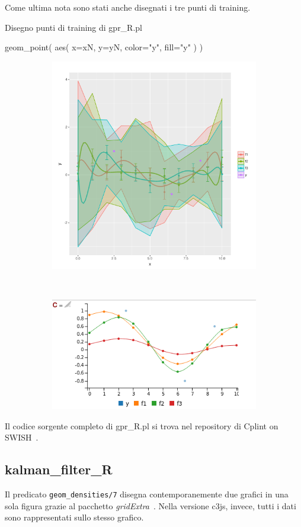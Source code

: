 \documentclass[10pt,titlepage,twoside,a4paper]{report}
\newenvironment{code}{\singlespacing\captionsetup{type=listing}}{}
\begin{document}
Come ultima nota sono stati anche disegnati i tre punti di training.
\begin{code}
\caption{Disegno punti di training di gpr\_R.pl}
\begin{rcode*}{}
geom_point(
    aes(
        x=xN,
        y=yN,
        color="y",
        fill="y"
    )
)
\end{rcode*}
\end{code}

\begin{figure}[H]
\caption{Risultato di \texttt{draw\_fun\_pred(sq\_exp\_p).} di gpr.pl}
\centering
    \begin{subfigure}[b]{0.5\textwidth}
        \includegraphics[width=.5\linewidth]{gpr_R_plot.png}
    \end{subfigure}~\begin{subfigure}[b]{0.5\textwidth}
        \includegraphics[width=.5\linewidth]{gpr_plot.png}
    \end{subfigure}
\end{figure}

Il codice sorgente completo di gpr\_R.pl si trova nel repository di 
Cplint on SWISH~\cite{gprRpl}.

\subsection{kalman\_filter\_R}
Il predicato \texttt{geom\_densities/7} disegna contemporanemente
due grafici in una sola figura grazie al pacchetto
\emph{gridExtra}~\cite{gridExtra}. Nella versione c3js, invece, tutti i dati 
sono rappresentati sullo stesso grafico.
\end{document}
